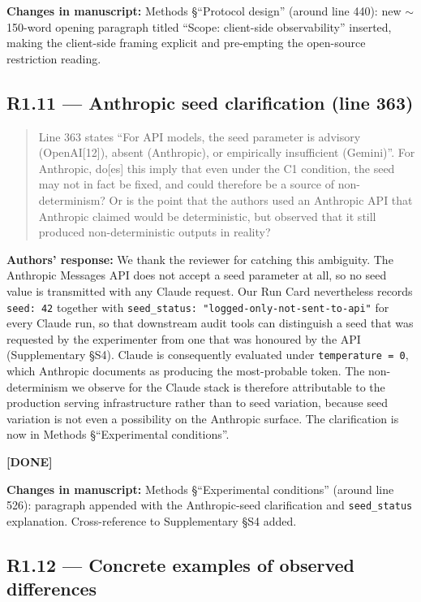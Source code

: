 \documentclass[11pt,a4paper]{article}
\newenvironment{revquote}{%
  \begin{quote}\small\itshape\color{revgray}
}{%
  \end{quote}
}
\newcommand{\response}[1]{\par\noindent\textbf{\color{revgreen}Authors' response:} #1\par}
\newcommand{\changes}[1]{\par\noindent\textbf{\color{revblue}Changes in manuscript:} #1\par}
\newcommand{\done}{\color{revgreen}\textbf{[DONE]}}
\begin{document}
\changes{Methods §``Protocol design'' (around line 440): new $\sim$150-word opening paragraph titled ``Scope: client-side observability'' inserted, making the client-side framing explicit and pre-empting the open-source restriction reading.}

\subsection*{R1.11 --- Anthropic seed clarification (line 363)}

\begin{revquote}
Line 363 states ``For API models, the seed parameter is advisory (OpenAI[12]), absent (Anthropic), or empirically insufficient (Gemini)''. For Anthropic, do[es] this imply that even under the C1 condition, the seed may not in fact be fixed, and could therefore be a source of non-determinism? Or is the point that the authors used an Anthropic API that Anthropic claimed would be deterministic, but observed that it still produced non-deterministic outputs in reality?
\end{revquote}

\response{We thank the reviewer for catching this ambiguity. The Anthropic Messages API does not accept a seed parameter at all, so no seed value is transmitted with any Claude request. Our Run Card nevertheless records \texttt{seed:\ 42} together with \texttt{seed\_status:\ "logged-only-not-sent-to-api"} for every Claude run, so that downstream audit tools can distinguish a seed that was requested by the experimenter from one that was honoured by the API (Supplementary §S4). Claude is consequently evaluated under \texttt{temperature\ =\ 0}, which Anthropic documents as producing the most-probable token. The non-determinism we observe for the Claude stack is therefore attributable to the production serving infrastructure rather than to seed variation, because seed variation is not even a possibility on the Anthropic surface. The clarification is now in Methods §``Experimental conditions''.} \done

\changes{Methods §``Experimental conditions'' (around line 526): paragraph appended with the Anthropic-seed clarification and \texttt{seed\_status} explanation. Cross-reference to Supplementary §S4 added.}

\subsection*{R1.12 --- Concrete examples of observed differences}
\end{document}
